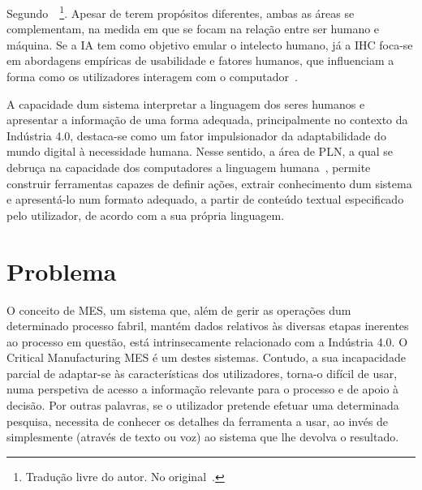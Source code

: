 Segundo~\textcite[p.1]{natural_language_translation_intersaction_ai_hci}~\footnote{Tradução livre do autor. No original~.}. Apesar de terem propósitos diferentes, ambas as áreas se complementam, na medida em que se focam na relação entre ser humano e máquina. Se a \gls{IA} tem como objetivo emular o intelecto humano, já a \gls{IHC} foca-se em abordagens empíricas de usabilidade e fatores humanos, que influenciam a forma como os utilizadores interagem com o computador~\parencite{natural_language_translation_intersaction_ai_hci}. 

A capacidade dum sistema interpretar a linguagem dos seres humanos e apresentar a informação de uma forma adequada, principalmente no contexto da Indústria 4.0, destaca-se como um fator impulsionador da adaptabilidade do mundo digital à necessidade humana. Nesse sentido, a área de \gls{PLN}, a qual se debruça na capacidade dos computadores  a linguagem humana~\parencite[p.1]{applied_natural_language_processing_with_python}, permite construir ferramentas capazes de definir ações, extrair conhecimento dum sistema e apresentá-lo num formato adequado, a partir de conteúdo textual especificado pelo utilizador, de acordo com a sua própria linguagem. 

\section{Problema}
\label{sec:chap1_problem}

O conceito de \gls{MES}, um sistema que, além de gerir as operações dum determinado processo fabril, mantém dados relativos às diversas etapas inerentes ao processo em questão, está intrinsecamente relacionado com a Indústria 4.0. O Critical Manufacturing \gls{MES} é um destes sistemas. Contudo, a sua incapacidade parcial de adaptar-se às características dos utilizadores, torna-o difícil de usar, numa perspetiva de acesso a informação relevante para o processo e de apoio à decisão. Por outras palavras, se o utilizador pretende efetuar uma determinada pesquisa, necessita de conhecer os detalhes da ferramenta a usar, ao invés de simplesmente  (através de texto ou voz) ao sistema que lhe devolva o resultado.

